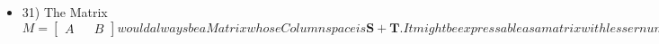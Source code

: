 \documentclass{article}
\begin{document}
\begin{itemize}
    \item 31) The Matrix $M = \begin{bmatrix}
      A && B
    \end{bmatrix} would always be a Matrix whose Column space is \mathbf{S+T}. It might be expressable as a matrix with lesser number of columns depending on whether what's the rank of A and B, as well as on if there could be some common vectors in the bases of \mathbf{S} and \mathbf{T}.$

  \end{itemize}
\end{document}
